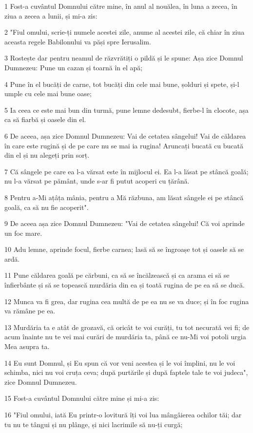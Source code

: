 \par 1 Fost-a cuvântul Domnului către mine, în anul al nouălea, în luna a zecea, în ziua a zecea a lunii, și mi-a zis:
\par 2 "Fiul omului, scrie-ți numele acestei zile, anume al acestei zile, că chiar în ziua aceasta regele Babilonului va păși spre Ierusalim.
\par 3 Rostește dar pentru neamul de răzvrătiți o pildă și le spune: Așa zice Domnul Dumnezeu: Pune un cazan și toarnă în el apă;
\par 4 Pune în el bucăți de carne, tot bucăți din cele mai bune, șolduri și spete, și-l umple cu cele mai bune oase;
\par 5 Ia ceea ce este mai bun din turmă, pune lemne dedesubt, fierbe-l în clocote, așa ca să fiarbă și oasele din el.
\par 6 De aceea, așa zice Domnul Dumnezeu: Vai de cetatea sângelui! Vai de căldarea în care este rugină și de pe care nu se mai ia rugina! Aruncați bucată cu bucată din el și nu alegeți prin sorț.
\par 7 Că sângele pe care ea l-a vărsat este în mijlocul ei. Ea l-a lăsat pe stâncă goală; nu l-a vărsat pe pământ, unde s-ar fi putut acoperi cu țărână.
\par 8 Pentru a-Mi ațâța mânia, pentru a Mă răzbuna, am lăsat sângele ei pe stâncă goală, ca să nu fie acoperit".
\par 9 De aceea așa zice Domnul Dumnezeu: "Vai de cetatea sângelui! Că voi aprinde un foc mare.
\par 10 Adu lemne, aprinde focul, fierbe carnea; lasă să se îngroașe tot și oasele să se ardă.
\par 11 Pune căldarea goală pe cărbuni, ca să se încălzească și ca arama ei să se înfierbânte și să se topească murdăria din ea și toată rugina de pe ea să se ducă.
\par 12 Munca va fi grea, dar rugina cea multă de pe ea nu se va duce; și în foc rugina va rămâne pe ea.
\par 13 Murdăria ta e atât de grozavă, că oricât te voi curăți, tu tot necurată vei fi; de acum înainte nu te vei mai curări de murdăria ta, până ce nu-Mi voi potoli urgia Mea asupra ta.
\par 14 Eu sunt Domnul, și Eu spun că vor veni acestea și le voi împlini, nu le voi schimba, nici nu voi cruța ceva; după purtările și după faptele tale te voi judeca", zice Domnul Dumnezeu.
\par 15 Fost-a cuvântul Domnului către mine și mi-a zis:
\par 16 "Fiul omului, iată Eu printr-o lovitură îți voi lua mângâierea ochilor tăi; dar tu nu te tângui și nu plânge, și nici lacrimile să nu-ți curgă;

